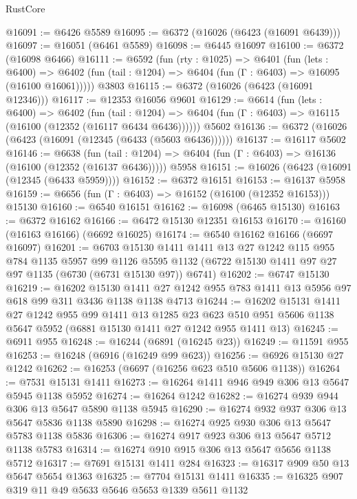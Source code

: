 \begin{lexlean}{RustCore}
\begin{coremodule}
@16091 := @6426 @5589
@16095 := @6372 (@16026 (@6423 (@16091 @6439)))
@16097 := @16051 (@6461 @5589)
@16098 := @6445 @16097
@16100 := @6372 (@16098 @6466)
@16111 := @6592
    (fun (rty : @1025) =>
    @6401
      (fun (lets : @6400) =>
      @6402 (fun (tail : @1204) => @6404 (fun (Γ : @6403) => @16095 (@16100 @16061)))))
    @3803
@16115 := @6372 (@16026 (@6423 (@16091 @12346)))
@16117 := @12353 @16056 @9601
@16129 := @6614
    (fun (lets : @6400) =>
    @6402
      (fun (tail : @1204) =>
      @6404 (fun (Γ : @6403) => @16115 (@16100 (@12352 (@16117 @6434 @6436))))))
    @5602
@16136 := @6372 (@16026 (@6423 (@16091 (@12345 (@6433 (@5603 @6436))))))
@16137 := @16117 @5602
@16146 := @6638
    (fun (tail : @1204) => @6404 (fun (Γ : @6403) => @16136 (@16100 (@12352 (@16137 @6436)))))
    @5958
@16151 := @16026 (@6423 (@16091 (@12345 (@6433 @5959))))
@16152 := @6372 @16151
@16153 := @16137 @5958
@16159 := @6656 (fun (Γ : @6403) => @16152 (@16100 (@12352 @16153))) @15130
@16160 := @6540 @16151
@16162 := @16098 (@6465 @15130)
@16163 := @6372 @16162
@16166 := @6472 @15130 @12351 @16153
@16170 := @16160 (@16163 @16166) (@6692 @16025)
@16174 := @6540 @16162 @16166 (@6697 @16097)
@16201 := @6703
    @15130
    @1411
    @1411
    @13
    @27
    @1242
    @115
    @955
    @784
    @1135
    @5957
    @99
    @1126
    @5595
    @1132
    (@6722 @15130 @1411 @97 @27 @97 @1135 (@6730 (@6731 @15130 @97)) @6741)
@16202 := @6747 @15130
@16219 := @16202
    @15130
    @1411
    @27
    @1242
    @955
    @783
    @1411
    @13
    @5956
    @97
    @618
    @99
    @311
    @3436
    @1138
    @1138
    @4713
@16244 := @16202
    @15131
    @1411
    @27
    @1242
    @955
    @99
    @1411
    @13
    @1285
    @23
    @623
    @510
    @951
    @5606
    @1138
    @5647
    @5952
    (@6881 @15130 @1411 @27 @1242 @955 @1411 @13)
@16245 := @6911 @955
@16248 := @16244 (@6891 (@16245 @23))
@16249 := @11591 @955
@16253 := @16248 (@6916 (@16249 @99 @623))
@16256 := @6926 @15130 @27 @1242
@16262 := @16253 (@6697 (@16256 @623 @510 @5606 @1138))
@16264 := @7531 @15131 @1411
@16273 := @16264 @1411 @946 @949 @306 @13 @5647 @5945 @1138 @5952
@16274 := @16264 @1242
@16282 := @16274 @939 @944 @306 @13 @5647 @5890 @1138 @5945
@16290 := @16274 @932 @937 @306 @13 @5647 @5836 @1138 @5890
@16298 := @16274 @925 @930 @306 @13 @5647 @5783 @1138 @5836
@16306 := @16274 @917 @923 @306 @13 @5647 @5712 @1138 @5783
@16314 := @16274 @910 @915 @306 @13 @5647 @5656 @1138 @5712
@16317 := @7691 @15131 @1411 @284
@16323 := @16317 @909 @50 @13 @5647 @5654 @1363
@16325 := @7704 @15131 @1411
@16335 := @16325 @907 @319 @11 @49 @5633 @5646 @5653 @1339 @5611 @1132

\end{coremodule}
\end{lexlean}
